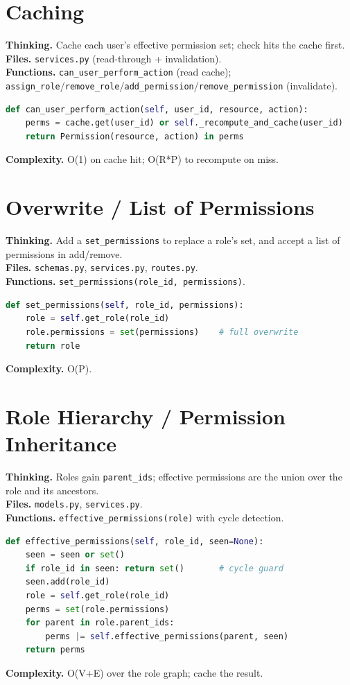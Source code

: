 \documentclass[11pt,a4paper]{report}
\begin{document}
\section{Caching}
\textbf{Thinking.} Cache each user's effective permission set; check hits the
cache first.\\
\textbf{Files.} \texttt{services.py} (read-through + invalidation).\\
\textbf{Functions.} \texttt{can\_user\_perform\_action} (read cache);
\texttt{assign\_role}/\texttt{remove\_role}/\texttt{add\_permission}/\texttt{remove\_permission}
(invalidate).
\begin{lstlisting}[language=Python]
def can_user_perform_action(self, user_id, resource, action):
    perms = cache.get(user_id) or self._recompute_and_cache(user_id)
    return Permission(resource, action) in perms
\end{lstlisting}
\textbf{Complexity.} O(1) on cache hit; O(R*P) to recompute on miss.

\section{Overwrite / List of Permissions}
\textbf{Thinking.} Add a \texttt{set\_permissions} to replace a role's set, and
accept a list of permissions in add/remove.\\
\textbf{Files.} \texttt{schemas.py}, \texttt{services.py}, \texttt{routes.py}.\\
\textbf{Functions.} \texttt{set\_permissions(role\_id, permissions)}.
\begin{lstlisting}[language=Python]
def set_permissions(self, role_id, permissions):
    role = self.get_role(role_id)
    role.permissions = set(permissions)    # full overwrite
    return role
\end{lstlisting}
\textbf{Complexity.} O(P).

\section{Role Hierarchy / Permission Inheritance}
\textbf{Thinking.} Roles gain \texttt{parent\_ids}; effective permissions are the
union over the role and its ancestors.\\
\textbf{Files.} \texttt{models.py}, \texttt{services.py}.\\
\textbf{Functions.} \texttt{effective\_permissions(role)} with cycle detection.
\begin{lstlisting}[language=Python]
def effective_permissions(self, role_id, seen=None):
    seen = seen or set()
    if role_id in seen: return set()       # cycle guard
    seen.add(role_id)
    role = self.get_role(role_id)
    perms = set(role.permissions)
    for parent in role.parent_ids:
        perms |= self.effective_permissions(parent, seen)
    return perms
\end{lstlisting}
\textbf{Complexity.} O(V+E) over the role graph; cache the result.
\end{document}
